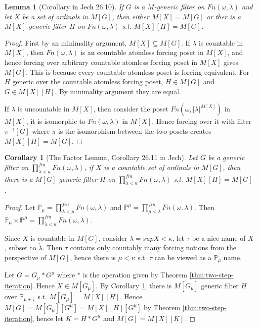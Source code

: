 \documentclass{article}
\newtheorem{lemma}{Lemma}
\newtheorem{corollary}{Corollary}
\newcommand{\bbP}{\mathbb{P}}
\begin{document}
\begin{lemma}[Corollary in Jech 26.10]
    If $G$ is a $M$-generic filter on $Fn(\omega,\lambda)$ and let $X$ be a set of ordinals in $M[G]$, then either $M[X] = M[G]$ or ther is a $M[X]$-generic filter $H$ on $Fn(\omega,\lambda)$ s.t. $M[X][H] = M[G]$.
\end{lemma}

\begin{proof}
    First by an minimality argument, $M[X]\subseteq M[G]$. 
    If $\lambda$ is countable in $M[X]$, then $Fn(\omega,\lambda)$ is an countable atomless forcing poset in $M[X]$, and hence forcing over arbitrary countable atomless forcing poset in $M[X]$ gives $M[G]$. This is because every countable atomless poset is forcing equivalent. For $H$ generic over the countable atomless forcing poset, $H\in M[G]$ and $G\in M[X][H]$. By minimality argument they are equal.

    If $\lambda$ is uncountable in $M[X]$, then consider the poset $Fn(\omega, |\lambda|^{M[X]})$ in $M[X]$, it is isomorphic to $Fn(\omega,\lambda)$ in $M[X]$. Hence forcing over it with filter $\pi^{-1}[G]$ where $\pi$ is the isomorphism between the two posets creates $M[X][H] = M[G]$.
\end{proof}


\begin{corollary}[The Factor Lemma, Corollary 26.11 in Jech] \label{cor:factorize-1}
    Let $G$ be a generic filter on $\prod^{fin}_{\lambda<\kappa}Fn(\omega, \lambda)$, if $X$ is a countable set of ordinals in $M[G]$, then there is a $M[G]$ generic filter $H$ on $\prod^{fin}_{\lambda<\kappa}Fn(\omega, \lambda)$ s.t. $M[X][H] = M[G]$.
\end{corollary}

\begin{proof}
    Let $\bbP_\mu = \prod^{fin}_{\lambda<\mu}Fn(\omega, \lambda)$ and $\bbP^\mu = \prod^{fin}_{\mu<\lambda}Fn(\omega, \lambda)$. Then $\bbP_\mu \times \bbP^\mu = \prod^{fin}_{\lambda<\kappa}Fn(\omega, \lambda)$. 

    Since $X$ is countable in $M[G]$, consider $\lambda = sup X<\kappa$, let $\tau$ be a nice name of $X$, subset to $\check{\lambda}$. Then $\tau$ contains only countably many forcing notions from the perspective of $M[G]$, hence there is $\mu<\kappa$ s.t. $\tau$ can be viewed as a $\bbP_\mu$ name.
    
    Let $G = G_\mu * G^\mu$ where $*$ is the operation given by Theorem \ref{thm:two-step-iteration}. 
    Hence $X\in M[G_\mu]$. By Corollary \ref{cor:factorize-1}, there is $M[G_\mu]$ generic filter $H$ over $\bbP_{\mu+1}$ s.t. $M[ G_\mu] = M[X][H]$. Hence $M[G] = M[G_\mu][G^\mu] = M[X][H][G^\mu]$ by Theorem \ref{thm:two-step-iteration}, hence let $K = H* G^\mu$ and $M[G] = M[X][K]$.
\end{proof}
\end{document}

